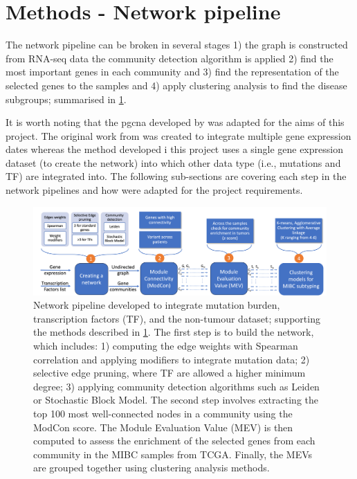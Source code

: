 \section{Methods - Network pipeline} \label{s:N_I:methods}

The network pipeline can be broken in several stages 1) the graph is constructed from RNA-seq data the community detection algorithm is applied 2) find the most important genes in each community and 3) find the representation of the selected genes to the samples and 4) apply clustering analysis to find the disease subgroups; summarised in \cref{fig:N_I:network_pipeline}.

It is worth noting that the \acrfull{pgcna} developed by \citet{Care2019-ij} was adapted for the aims of this project. The original work from \citep{Care2019-ij} was created to integrate multiple gene expression dates whereas the method developed i this project uses a single gene expression dataset (to create the network) into which other data type (i.e., mutations and TF) are integrated into. The following sub-sections are covering each step in the network pipelines and how were adapted for the project requirements.

\begin{figure}
    \centering
    \includegraphics[width=1.0\textwidth,keepaspectratio]{Sections/Network_I/Resources/Methods/network_pipeline.png}
    \caption[The integrative network pipeline]{Network pipeline developed to integrate mutation burden, transcription factors (TF), and the non-tumour dataset; supporting the methods described in \cref{s:N_I:methods}. The first step is to build the network, which includes: 1) computing the edge weights with Spearman correlation and applying modifiers to integrate mutation data; 2) selective edge pruning, where TF are allowed a higher minimum degree; 3) applying community detection algorithms such as Leiden or Stochastic Block Model. The second step involves extracting the top 100 most well-connected nodes in a community using the ModCon score. The Module Evaluation Value (MEV) is then computed to assess the enrichment of the selected genes from each community in the MIBC samples from TCGA. Finally, the MEVs are grouped together using clustering analysis methods.}
    \hfill
    \label{fig:N_I:network_pipeline}
\end{figure}


